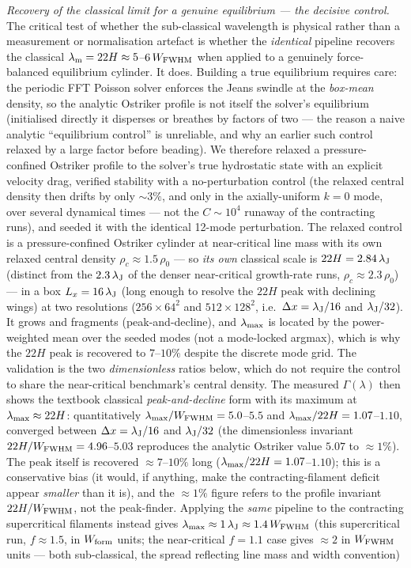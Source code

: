 \documentclass[usenatbib,twoside,twocolumn]{mnras}
\begin{document}
\emph{Recovery of the classical limit for a genuine equilibrium --- the decisive control.} The critical test of whether the sub-classical wavelength is physical rather than a measurement or normalisation artefact is whether the \emph{identical} pipeline recovers the classical $\lambda_{\rm m}=22H\approx5$--$6\,W_{\rm FWHM}$ when applied to a genuinely force-balanced equilibrium cylinder. It does. Building a true equilibrium requires care: the periodic FFT Poisson solver enforces the Jeans swindle at the \emph{box-mean} density, so the analytic Ostriker profile is not itself the solver's equilibrium (initialised directly it disperses or breathes by factors of two --- the reason a naive analytic ``equilibrium control'' is unreliable, and why an earlier such control relaxed by a large factor before beading). We therefore relaxed a pressure-confined Ostriker profile to the solver's true hydrostatic state with an explicit velocity drag, verified stability with a no-perturbation control (the relaxed central density then drifts by only $\sim3\%$, and only in the axially-uniform $k=0$ mode, over several dynamical times --- not the $C\sim10^{4}$ runaway of the contracting runs), and seeded it with the identical 12-mode perturbation. The relaxed control is a pressure-confined Ostriker cylinder at near-critical line mass with its own relaxed central density $\rho_c\approx1.5\,\rho_0$ --- so \emph{its own} classical scale is $22H=2.84\,\lambda_{\rm J}$ (distinct from the $2.3\,\lambda_{\rm J}$ of the denser near-critical growth-rate runs, $\rho_c\approx2.3\,\rho_0$) --- in a box $L_x=16\,\lambda_{\rm J}$ (long enough to resolve the $22H$ peak with declining wings) at two resolutions ($256\times64^2$ and $512\times128^2$, i.e.\ $\Delta x=\lambda_{\rm J}/16$ and $\lambda_{\rm J}/32$). It grows and fragments (peak-and-decline), and $\lambda_{\rm max}$ is located by the power-weighted mean over the seeded modes (not a mode-locked argmax), which is why the $22H$ peak is recovered to $7$--$10\%$ despite the discrete mode grid. The validation is the two \emph{dimensionless} ratios below, which do not require the control to share the near-critical benchmark's central density. The measured $\Gamma(\lambda)$ then shows the textbook classical \emph{peak-and-decline} form with its maximum at $\lambda_{\rm max}\approx22H$: quantitatively $\lambda_{\rm max}/W_{\rm FWHM}=5.0$--$5.5$ and $\lambda_{\rm max}/22H=1.07$--$1.10$, converged between $\Delta x=\lambda_{\rm J}/16$ and $\lambda_{\rm J}/32$ (the dimensionless invariant $22H/W_{\rm FWHM}=4.96$--$5.03$ reproduces the analytic Ostriker value $5.07$ to $\approx1\%$). The peak itself is recovered $\approx7$--$10\%$ long ($\lambda_{\rm max}/22H=1.07$--$1.10$); this is a conservative bias (it would, if anything, make the contracting-filament deficit appear \emph{smaller} than it is), and the $\approx1\%$ figure refers to the profile invariant $22H/W_{\rm FWHM}$, not the peak-finder. Applying the \emph{same} pipeline to the contracting supercritical filaments instead gives $\lambda_{\rm max}\approx1\,\lambda_{\rm J}\approx1.4\,W_{\rm FWHM}$ (this supercritical run, $f\approx1.5$, in $W_{\rm form}$ units; the near-critical $f=1.1$ case gives $\approx2$ in $W_{\rm FWHM}$ units --- both sub-classical, the spread reflecting line mass and width convention) 
\end{document}
